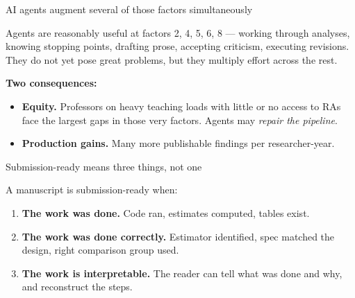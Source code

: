 \documentclass[aspectratio=169,12pt,t]{beamer}
\begin{document}
\begin{frame}{AI agents augment several of those factors simultaneously}
\vspace{0.2cm}

Agents are reasonably useful at factors 2, 4, 5, 6, 8 --- working through analyses, knowing stopping points, drafting prose, accepting criticism, executing revisions. \;They do not yet pose great problems, but they multiply effort across the rest.

\vspace{0.3cm}
\textbf{Two consequences:}
\begin{itemize}\small\setlength\itemsep{1pt}
  \item \textbf{Equity.} \;Professors on heavy teaching loads with little or no access to RAs face the largest gaps in those very factors. \;Agents may \textit{repair the pipeline}.
  \item \textbf{Production gains.} \;Many more publishable findings per researcher-year.
\end{itemize}

\vspace{0.3cm}
\end{frame}

\begin{frame}{Submission-ready means three things, not one}
\vspace{0.3cm}

A manuscript is submission-ready when:
\begin{enumerate}\setlength\itemsep{3pt}
  \item \textbf{The work was done.} \;Code ran, estimates computed, tables exist.
  \item \textbf{The work was done correctly.} \;Estimator identified, spec matched the design, right comparison group used.
  \item \textbf{The work is interpretable.} \;The reader can tell what was done and why, and reconstruct the steps.
\end{enumerate}

\vspace{0.4cm}


\vspace{0.3em}
\end{frame}
\end{document}

